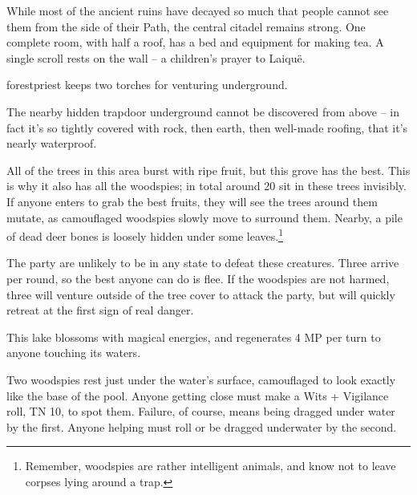 \label{lost_city_map}

\begin{multicols}{2}

\label{lost_citadel}
While most of the ancient ruins have decayed so much that people cannot see them from the side of their Path, the central citadel remains strong.
One complete room,  with half a roof, has a bed and equipment for making tea.
A single scroll rests on the wall -- a children's prayer to Laiqu\"{e}.

\Gls{forestpriest} keeps two torches for venturing underground.

The nearby hidden trapdoor underground cannot be discovered from above -- in fact it's so tightly covered with rock, then earth, then well-made roofing, that it's nearly waterproof.


All of the trees in this area burst with ripe fruit, but this grove has the best.
This is why it also has all the woodspies; in total around 20 sit in these trees invisibly.
If anyone enters to grab the best fruits, they will see the trees around them mutate, as camouflaged woodspies slowly move to surround them.
Nearby, a pile of dead deer bones is loosely hidden under some leaves.\footnote{Remember, woodspies are rather intelligent animals, and know not to leave corpses lying around a trap.}


The party are unlikely to be in any state to defeat these creatures.  Three arrive per round, so the best anyone can do is flee.  If the woodspies are not harmed, three will venture outside of the tree cover to attack the party, but will quickly retreat at the first sign of real danger.

\woodspy


This lake blossoms with magical energies, and regenerates 4 MP per turn to anyone touching its waters.

Two woodspies rest just under the water's surface, camouflaged to look exactly like the base of the pool.
Anyone getting close must make a Wits + Vigilance roll, TN 10, to spot them.
Failure, of course, means being dragged under water by the first.
Anyone helping must roll or be dragged underwater by the second.



\end{multicols}
